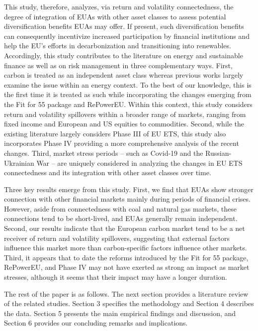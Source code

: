 \documentclass[preprint, 3p,
authoryear]{elsarticle} %
\begin{document}
This study, therefore, analyzes, via return and volatility
connectedness, the degree of integration of EUAs with other asset
classes to assess potential diversification benefits EUAs may offer. If
present, such diversification benefits can consequently incentivize
increased participation by financial institutions and help the EU's
efforts in decarbonization and transitioning into renewables.
Accordingly, this study contributes to the literature on energy and
sustainable finance as well as on risk management in three complementary
ways. First, carbon is treated as an independent asset class whereas
previous works largely examine the issue within an energy context. To
the best of our knowledge, this is the first time it is treated as such
while incorporating the changes emerging from the Fit for 55 package and
RePowerEU. Within this context, this study considers return and
volatility spillovers within a broader range of markets, ranging from
fixed income and European and US equities to commodities. Second, while
the existing literature largely considers Phase III of EU ETS, this
study also incorporates Phase IV providing a more comprehensive analysis
of the recent changes. Third, market stress periods -- such as Covid-19
and the Russian-Ukrainian War -- are uniquely considered in analyzing
the changes in EU ETS connectedness and its integration with other asset
classes over time.

Three key results emerge from this study. First, we find that EUAs show
stronger connection with other financial markets mainly during periods
of financial crises. However, aside from connectedness with coal and
natural gas markets, these connections tend to be short-lived, and EUAs
generally remain independent. Second, our results indicate that the
European carbon market tend to be a net receiver of return and
volatility spillovers, suggesting that external factors influence this
market more than carbon-specific factors influence other markets. Third,
it appears that to date the reforms introduced by the Fit for 55
package, RePowerEU, and Phase IV may not have exerted as strong an
impact as market stresses, although it seems that their impact may have
a longer duration.

The rest of the paper is as follows. The next section provides a
literature review of the related studies. Section 3 specifies the
methodology and Section 4 describes the data. Section 5 presents the
main empirical findings and discussion, and Section 6 provides our
concluding remarks and implications.
\end{document}
